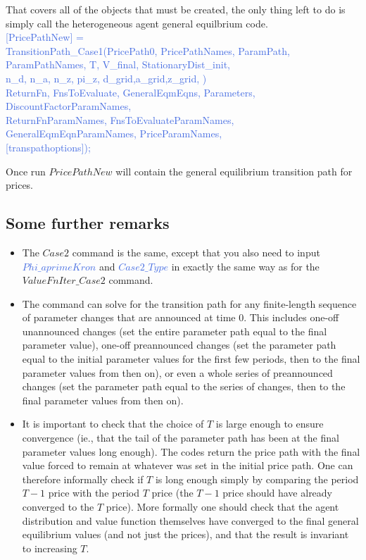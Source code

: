 That covers all of the objects that must be created, the only thing left to do is simply call the heterogeneous agent general equilbrium code. \\
\textcolor{RoyalBlue}{[PricePathNew] =} \\
\indent \textcolor{RoyalBlue}{  TransitionPath\_{}Case1(PricePath0, PricePathNames, ParamPath, ParamPathNames, T, V\_{}final, StationaryDist\_{}init, } \\
\indent \indent \textcolor{RoyalBlue}{   n\_{}d, n\_{}a, n\_{}z, pi\_{}z, d\_{}grid,a\_{}grid,z\_{}grid, )} \\
\indent \indent \textcolor{RoyalBlue}{   ReturnFn, FnsToEvaluate, GeneralEqmEqns, Parameters, DiscountFactorParamNames, } \\
\indent \indent \textcolor{RoyalBlue}{   ReturnFnParamNames, FnsToEvaluateParamNames, GeneralEqmEqnParamNames, PriceParamNames,} \\
\indent \indent \textcolor{RoyalBlue}{   [transpathoptions]);}

Once run $PricePathNew$ will contain the general equilibrium transition path for prices.

\subsection{Some further remarks}
\begin{itemize}
 \item The $Case2$ command is the same, except that you also need to input \textcolor{RoyalBlue}{$Phi\_{}aprimeKron$} and \textcolor{RoyalBlue}{$Case2\_{}Type$}
   in exactly the same way as for the $ValueFnIter\_{}Case2$ command.
 \item The command can solve for the transition path for any finite-length sequence of parameter changes that are announced at time 0. This includes one-off unannounced
   changes (set the entire parameter path equal to the final parameter value), one-off preannounced changes (set the parameter path equal to the initial parameter values
   for the first few periods, then to the final parameter values from then on), or even a whole series of preannounced changes (set the parameter path equal to the series
   of changes, then to the final parameter values from then on).
 \item It is important to check that the choice of $T$ is large enough to ensure convergence (ie., that the tail of the parameter path has been at the final parameter values
   long enough). The codes return the price path with the final value forced to remain at whatever was set in the initial price path. One can therefore informally check if $T$ is long enough simply
   by comparing the period $T-1$ price with the period $T$ price (the $T-1$ price should have already converged to the $T$ price). More formally one should check that the agent distribution
   and value function themselves have converged to the final general equilibrium values (and not just the prices), and that the result is invariant to increasing $T$.
\end{itemize}

